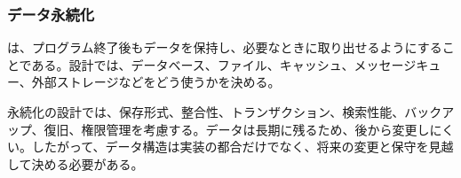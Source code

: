 \subsubsection{データ永続化}

 は、プログラム終了後もデータを保持し、必要なときに取り出せるようにすることである。設計では、データベース、ファイル、キャッシュ、メッセージキュー、外部ストレージなどをどう使うかを決める。

永続化の設計では、保存形式、整合性、トランザクション、検索性能、バックアップ、復旧、権限管理を考慮する。データは長期に残るため、後から変更しにくい。したがって、データ構造は実装の都合だけでなく、将来の変更と保守を見越して決める必要がある。
